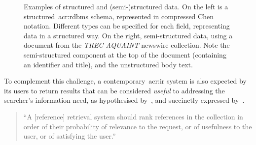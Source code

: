 \begin{figure}[t!]
    \centering
    \caption[Structured and (semi-)structured data]{Examples of structured and (semi-)structured data. On the left is a structured~\gls{acr:rdbms} schema, represented in compressed Chen notation. Different types can be specified for each field, representing data in a structured way. On the right, semi-structured data, using a document from the \emph{TREC AQUAINT} newswire collection. Note the semi-structured component at the top of the document (containing an identifier and title), and the unstructured body text.}
    \label{fig:structured_data}
\end{figure}

To complement this challenge, a contemporary~\gls{acr:ir} system is also expected by its users to return results that can be considered \emph{useful} to addressing the searcher's information need, as hypothesised by~\cite{luhn1957ranking_query}, and succinctly expressed by~\cite{robertson1977prp}.

\begin{quote}
    ``A [reference] retrieval system should rank references in the collection in order of their probability of relevance to the request, or of usefulness to the user, or of satisfying the user.''
\end{quote}

